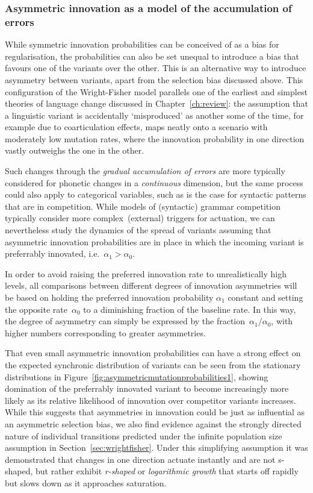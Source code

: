 \subsubsection{Asymmetric innovation as a model of the accumulation of errors}

While symmetric innovation probabilities can be conceived of as a bias for regularisation, the probabilities can also be set unequal to introduce a bias that favours one of the variants over the other. This is an alternative way to introduce asymmetry between variants, apart from the selection bias discussed above. This configuration of the Wright-Fisher model parallels one of the earliest and simplest theories of language change discussed in Chapter~\ref{ch:review}: the assumption that a linguistic variant is accidentally `misproduced' as another some of the time, for example due to coarticulation effects, maps neatly onto a scenario with moderately low mutation rates, where the innovation probability in one direction vastly outweighs the one in the other. %

Such changes through the \emph{gradual accumulation of errors} are more typically considered for phonetic changes in a \emph{continuous} dimension, but the same process could also apply to categorical variables, such as is the case for syntactic patterns that are in competition.
While models of (syntactic) grammar competition typically consider more complex~(external) triggers for actuation, we can nevertheless study the dynamics of the spread of variants assuming that asymmetric innovation probabilities are in place in which the incoming variant is preferrably innovated, i.e.~$\alpha_1>\alpha_0$.

In order to avoid raising the preferred innovation rate to unrealistically high levels, all comparisons between different degrees of innovation asymmetries will be based on holding the preferred innovation probability $\alpha_1$ constant and setting the opposite rate~$\alpha_0$ to a diminishing fraction of the baseline rate. In this way, the degree of asymmetry can simply be expressed by the fraction~$\alpha_1/\alpha_0$, with higher numbers corresponding to greater asymmetries.

That even small asymmetric innovation probabilities can have a strong effect on the expected synchronic distribution of variants can be seen from the stationary distributions in Figure~\ref{fig:asymmetricmutationprobabilities1}, showing domination of the preferrably innovated variant to become increasingly more likely as its relative likelihood of innovation over competitor variants increases.
While this suggests that asymmetries in innovation could be just as influential as an asymmetric selection bias, we also find evidence against the strongly directed nature of individual transitions predicted under the infinite population size assumption in Section~\ref{sec:wrightfisher}. Under this simplifying assumption it was demonstrated that changes in one direction actuate instantly and are not s-shaped, but rather exhibit \emph{r-shaped} or \emph{logarithmic growth} that starts off rapidly but slows down as it approaches saturation.

